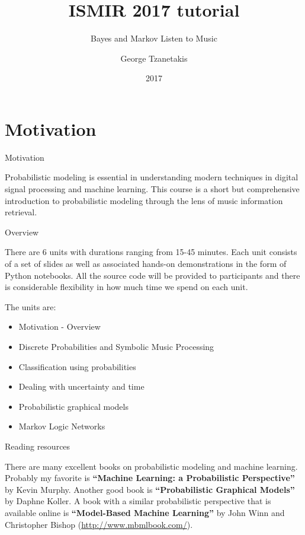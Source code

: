 \documentclass[12pt]{beamer}
\title[ISMIR 2017 tutorial]{ISMIR 2017 tutorial}
\subtitle[Bayes and Markov Listen to Music]{Bayes and Markov Listen to Music}
\date[2017]{2017}
\author[G. Tzanetakis]{George Tzanetakis}
\institute[University of Victoria]{University of Victoria}
\begin{document}
\frame{\maketitle} %



\section{Motivation} 

\begin{frame}{Motivation} 

Probabilistic modeling is essential in understanding modern techniques
in digital signal processing and machine learning. This course is a
short but comprehensive introduction to probabilistic modeling through
the lens of music information retrieval. 
\end{frame} 


\begin{frame}{Overview} 

  There are 6 units with durations ranging from 15-45 minutes. Each
  unit consists of a set of slides as well as associated hands-on
  demonstrations in the form of Python notebooks.  All the source code
  will be provided to participants and there is considerable
  flexibility in how much time we spend on each unit.

  The units are: 
\begin{itemize} 
\item Motivation - Overview 
\item Discrete Probabilities and Symbolic Music
Processing   
\item Classification using probabilities
\item Dealing with uncertainty and time
\item Probabilistic graphical models
\item Markov Logic Networks 
\end{itemize} 


\end{frame} 



\begin{frame}{Reading resources}

There are many excellent books on probabilistic modeling and machine
learning. Probably my favorite is {\bf ``Machine Learning: a
  Probabilistic Perspective''} by Kevin Murphy. Another good book is
{\bf ``Probabilistic Graphical Models''} by Daphne Koller. A book with
a similar probabilistic perspective that is available online is
{\bf ``Model-Based Machine Learning''} by John Winn and Christopher Bishop
(\url{http://www.mbmlbook.com/}).

  

\end{frame} 
\end{document}

